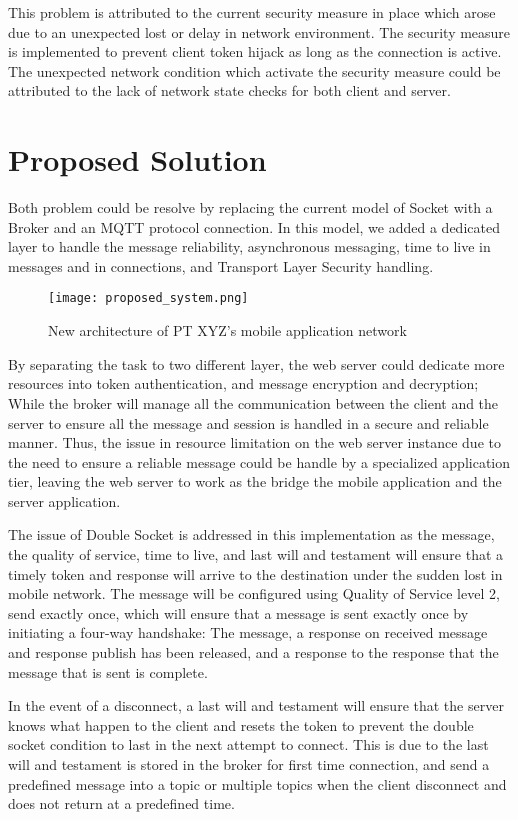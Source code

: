 This problem is attributed to the current security measure in place which arose due to an unexpected lost or delay in network environment. The security measure is implemented to prevent client token hijack as long as the connection is active. The unexpected network condition which activate the security measure could be attributed to the lack of network state checks for both client and server. 

\section{Proposed Solution}
Both problem could be resolve by replacing the current model of Socket with a Broker and an MQTT protocol connection. In this model, we added a dedicated layer to handle the message reliability, asynchronous messaging, time to live in messages and in connections, and Transport Layer Security handling.

\begin{figure}[h]
\centering
\texttt{[image: proposed\_system.png]}
\caption{New architecture of PT XYZ's mobile application network}
\label{fig:solution}
\end{figure}
By separating the task to two different layer, the web server could dedicate more resources into token authentication, and message encryption and decryption; While the broker will manage all the communication between the client and the server to ensure all the message and session is handled in a secure and reliable manner. Thus, the issue in resource limitation on the web server instance due to the need to ensure a reliable message could be handle by a specialized application tier, leaving the web server to work as the bridge the mobile application and the server application.

The issue of Double Socket is addressed in this implementation as the message, the quality of service, time to live, and last will and testament will ensure that a timely token and response will arrive to the destination under the sudden lost in mobile network. The message will be configured using Quality of Service level 2, send exactly once, which will ensure that a message is sent exactly once by initiating a four-way handshake: The message, a response on received message and response publish has been released, and a response to the response that the message that is sent is complete. 

In the event of a disconnect, a last will and testament will ensure that the server knows what happen to the client and resets the token to prevent the double socket condition to last in the next attempt to connect. This is due to the last will and testament is stored in the broker for first time connection, and send a predefined message into a topic or multiple topics when the client disconnect and does not return at a predefined time. 


